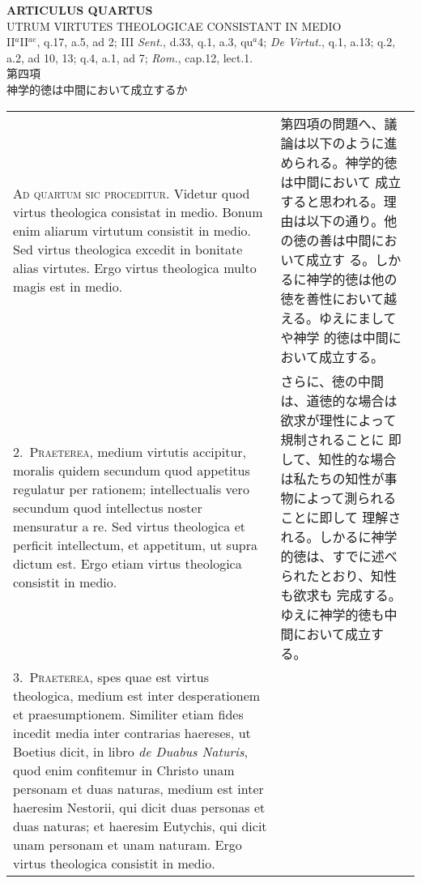 \documentclass[10pt]{jsarticle}
\begin{document}
\begin{center}
{\Large {\bf ARTICULUS QUARTUS}}\\
{\large UTRUM VIRTUTES THEOLOGICAE CONSISTANT IN MEDIO}\\
{\footnotesize II$^{a}$II$^{ae}$, q.17, a.5, ad 2; III {\itshape Sent.}, d.33, q.1, a.3, qu$^{a}$}4; {\itshape De Virtut.}, q.1, a.13; q.2, a.2, ad 10, 13; q.4, a.1, ad 7; {\itshape Rom.}, cap.12, lect.1.\\
{\Large 第四項\\神学的徳は中間において成立するか}
\end{center}

\begin{longtable}{p{21em}p{21em}}
 {\scshape Ad quartum sic proceditur}. Videtur quod virtus theologica
 consistat in medio. Bonum enim aliarum virtutum consistit in
 medio. Sed virtus theologica excedit in bonitate alias virtutes. Ergo
 virtus theologica multo magis est in medio.
 
&

 第四項の問題へ、議論は以下のように進められる。神学的徳は中間において
 成立すると思われる。理由は以下の通り。他の徳の善は中間において成立す
 る。しかるに神学的徳は他の徳を善性において越える。ゆえにましてや神学
 的徳は中間において成立する。

\\


2.~{\scshape Praeterea}, medium virtutis accipitur, moralis quidem
secundum quod appetitus regulatur per rationem; intellectualis vero
secundum quod intellectus noster mensuratur a re. Sed virtus
theologica et perficit intellectum, et appetitum, ut supra dictum
est. Ergo etiam virtus theologica consistit in medio.
 
&

 さらに、徳の中間は、道徳的な場合は欲求が理性によって規制されることに
 即して、知性的な場合は私たちの知性が事物によって測られることに即して
 理解される。しかるに神学的徳は、すでに述べられたとおり、知性も欲求も
 完成する。ゆえに神学的徳も中間において成立する。

\\

3.~{\scshape Praeterea}, spes quae est virtus theologica, medium est
inter desperationem et praesumptionem. Similiter etiam fides incedit
media inter contrarias haereses, ut Boetius dicit, in libro {\itshape
de Duabus Naturis}, quod enim confitemur in Christo unam personam et
duas naturas, medium est inter haeresim Nestorii, qui dicit duas
personas et duas naturas; et haeresim Eutychis, qui dicit unam
personam et unam naturam. Ergo virtus theologica consistit in medio.
 

\end{longtable}
\end{document}
